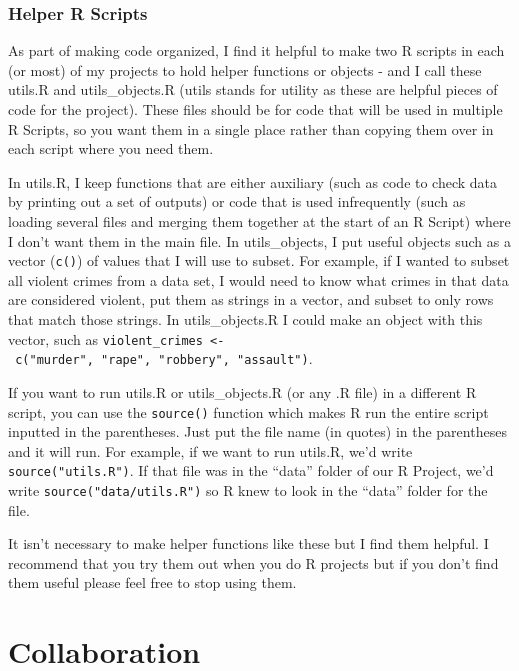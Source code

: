 \documentclass[
]{krantz}
\begin{document}
\hypertarget{helper-r-scripts}{%
\subsection{Helper R Scripts}\label{helper-r-scripts}}

As part of making code organized, I find it helpful to make two R scripts in each (or most) of my projects to hold helper functions or objects - and I call these utils.R and utils\_objects.R (utils stands for utility as these are helpful pieces of code for the project). These files should be for code that will be used in multiple R Scripts, so you want them in a single place rather than copying them over in each script where you need them.

In utils.R, I keep functions that are either auxiliary (such as code to check data by printing out a set of outputs) or code that is used infrequently (such as loading several files and merging them together at the start of an R Script) where I don't want them in the main file. In utils\_objects, I put useful objects such as a vector (\texttt{c()}) of values that I will use to subset. For example, if I wanted to subset all violent crimes from a data set, I would need to know what crimes in that data are considered violent, put them as strings in a vector, and subset to only rows that match those strings. In utils\_objects.R I could make an object with this vector, such as \texttt{violent\_crimes\ \textless{}-\ c("murder",\ "rape",\ "robbery",\ "assault")}.

If you want to run utils.R or utils\_objects.R (or any .R file) in a different R script, you can use the \texttt{source()} function which makes R run the entire script inputted in the parentheses. Just put the file name (in quotes) in the parentheses and it will run. For example, if we want to run utils.R, we'd write \texttt{source("utils.R")}. If that file was in the ``data'' folder of our R Project, we'd write \texttt{source("data/utils.R")} so R knew to look in the ``data'' folder for the file.

It isn't necessary to make helper functions like these but I find them helpful. I recommend that you try them out when you do R projects but if you don't find them useful please feel free to stop using them.

\hypertarget{collaboration}{%
\chapter{Collaboration}\label{collaboration}}
\end{document}
